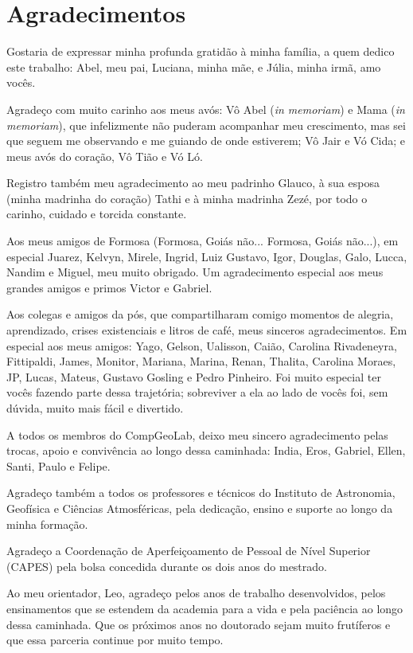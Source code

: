 \documentclass[a4paper,oneside,10pt]{book}
\begin{document}
\newpage
\section*{Agradecimentos}

Gostaria de expressar minha profunda gratidão à minha família, a quem dedico
este trabalho: Abel, meu pai, Luciana, minha mãe, e Júlia, minha irmã, amo vocês.

Agradeço com muito carinho aos meus avós: Vô Abel (\textit{in memoriam}) e
Mama (\textit{in memoriam}), que infelizmente não puderam acompanhar meu
crescimento, mas sei que seguem me observando e me guiando de onde
estiverem; Vô Jair e Vó Cida; e meus avós do coração, Vô Tião e Vó Ló.

Registro também meu agradecimento ao meu padrinho Glauco, à sua esposa (minha madrinha do coração)
Tathi e à minha madrinha Zezé, por todo o carinho, cuidado e torcida
constante.

Aos meus amigos de Formosa (Formosa, Goiás não... Formosa, Goiás não...), em
especial Juarez, Kelvyn, Mirele, Ingrid, Luiz Gustavo, Igor, Douglas,
Galo, Lucca, Nandim e Miguel, meu muito obrigado. Um agradecimento
especial aos meus grandes amigos e primos Victor e Gabriel.

Aos colegas e amigos da pós, que compartilharam comigo momentos de
alegria, aprendizado, crises existenciais e litros de café,
meus sinceros agradecimentos. Em especial aos meus amigos: Yago, Gelson,
Ualisson, Caião, Carolina Rivadeneyra, Fittipaldi, James, Monitor, Mariana,
Marina, Renan, Thalita, Carolina Moraes, JP, Lucas, Mateus, Gustavo Gosling e Pedro
Pinheiro. Foi muito especial ter vocês fazendo parte dessa trajetória;
sobreviver a ela ao lado de vocês foi, sem dúvida, muito mais fácil e
divertido.

A todos os membros do CompGeoLab, deixo meu sincero agradecimento pelas
trocas, apoio e convivência ao longo dessa caminhada: India, Eros,
Gabriel, Ellen, Santi, Paulo e Felipe.

Agradeço também a todos os professores e técnicos do Instituto de
Astronomia, Geofísica e Ciências Atmosféricas, pela dedicação, ensino e
suporte ao longo da minha formação.

Agradeço a Coordenação de Aperfeiçoamento de Pessoal de Nível Superior (CAPES) pela bolsa concedida
durante os dois anos do mestrado.


Ao meu orientador, Leo, agradeço pelos anos de trabalho desenvolvidos,
pelos ensinamentos que se estendem da academia para a vida e pela
paciência ao longo dessa caminhada. Que os próximos anos no doutorado
sejam muito frutíferos e que essa parceria continue por muito tempo.
\end{document}
